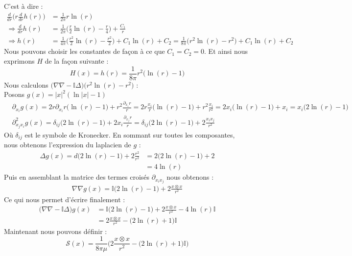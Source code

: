 C'est à dire :
\begin{align*}
    \frac{d}{dr} \bigg(r \frac{d}{dr}h(r) \bigg) &= \frac{1}{2\pi}r\ln(r) \\
    \Rightarrow \frac{d}{dr} h(r) &= \frac{1}{2\pi} \bigg( \frac{r}{2} \ln (r) - \frac{r}{4} \bigg) + \frac{C_1}{r} \\
    \Rightarrow h(r) &= \frac{1}{4\pi}\bigg( \frac{r^2}{2} \ln (r) - \frac{r^2}{2} \bigg) + C_1 \ln(r) + C_2 = \frac{1}{8\pi}\bigg( r^2 \ln (r) - r^2 \bigg) + C_1 \ln(r) + C_2
\end{align*}
Nous pouvons choisir les constantes de façon à ce que $C_1 = C_2 = 0$. Et ainsi nous exprimons $H$ de la façon suivante :
$$H(x) = h(r) = \frac{1}{8\pi} r^2\Big( \ln(r) - 1 \Big) $$
Nous calculons $\big(\nabla \nabla - \mathbb{I}\Delta\big)\big(r^2\ln(r) - r^2\big)$ :\\
Posons $g(x) = |x|^2(\ln|x| - 1)$
\begin{align*}
    &\partial_{x_i} g(x) = 2 r \partial_{x_i}r \big(\ln(r) - 1\big) + r^2 \frac{\partial_{x_i}r}{r} = 2r\frac{x_i}{r} \big(\ln(r) - 1\big) + r^2\frac{x_i}{r^2} = 2 x_i \big( \ln(r) - 1 \big) + x_i = x_i \big( 2\ln (r) - 1 \big) \\
    &\partial_{x_j x_i}^2 g(x) =  \delta_{ij}\big(2 \ln(r) - 1 \big) + 2 x_i \frac{\partial_{x_j} r}{r} = \delta_{ij} \big( 2\ln(r) - 1 \big) + 2\frac{x_i x_j}{r^2}
\end{align*}
Où $\delta_{ij}$ est le symbole de Kronecker.
En sommant sur toutes les composantes, nous obtenons l'expression du laplacien de $g$ :
\begin{align*}
    \Delta g(x) = d \big(2 \ln(r) - 1 \big) +  2 \frac{r^2}{r^2} &= 2 \big(2 \ln(r) - 1 \big) + 2 \\
    &=  4 \ln(r)
\end{align*}
Puis en assemblant la matrice des termes croisés $\partial_{x_i x_j}$ nous obtenons :
\begin{align*}
    \nabla \nabla g(x) = \mathbb{I}\big( 2\ln(r) - 1 \big) + 2\frac{x \otimes x}{r^2}
\end{align*}
Ce qui nous permet d'écrire finalement :
\begin{align*}
    \big( \nabla \nabla - \mathbb{I}\Delta \big)g(x) &= \mathbb{I}\big( 2 \ln(r) - 1 \big) + 2\frac{x \otimes x}{r^2} - 4 \ln(r) \mathbb{I} \\
    &= 2 \frac{x \otimes x}{r^2} - \big(2 \ln(r) + 1 \big)\mathbb{I}
\end{align*}
Maintenant nous pouvons définir : 
$$\mathscr{S}(x) = \frac{1}{8\pi \mu} \bigg( 2 \frac{x \otimes x}{r^2} - \big( 2\ln(r) + 1 \big)\mathbb{I} \bigg) $$

